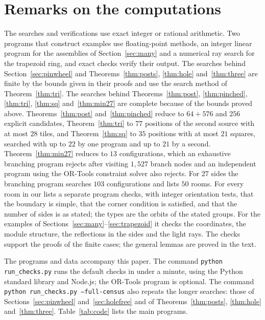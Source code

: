 \documentclass[11pt,a4paper]{article}
\theoremstyle{plain}
\theoremstyle{definition}
\theoremstyle{remark}
\numberwithin{equation}{section}
\begin{document}
\section{Remarks on the computations}\label{sec:computations}

The searches and verifications use exact integer or rational arithmetic. Two programs that construct examples use floating-point methods, an integer linear program for the assemblies of Section~\ref{sec:many} and a numerical ray search for the trapezoid ring, and exact checks verify their output. The searches behind Section~\ref{sec:pinwheel} and Theorems~\ref{thm:posts}, \ref{thm:hole} and~\ref{thm:three} are finite by the bounds given in their proofs and use the search method of Theorem~\ref{thm:tri}. The searches behind Theorems~\ref{thm:post}, \ref{thm:pinched}, \ref{thm:tri}, \ref{thm:sq} and~\ref{thm:min27} are complete because of the bounds proved above. Theorems~\ref{thm:post} and~\ref{thm:pinched} reduce to $64+576$ and $256$ explicit candidates, Theorem~\ref{thm:tri} to $77$ positions of the second source with at most $28$ tiles, and Theorem~\ref{thm:sq} to $35$ positions with at most $21$ squares, searched with up to $22$ by one program and up to $21$ by a second. Theorem~\ref{thm:min27} reduces to $13$ configurations, which an exhaustive branching program rejects after visiting $1{,}527$ branch nodes and an independent program using the OR-Tools constraint solver also rejects. For $27$ sides the branching program searches $103$ configurations and lists $50$ rooms. For every room in our lists a separate program checks, with integer orientation tests, that the boundary is simple, that the corner condition is satisfied, and that the number of sides is as stated; the types are the orbits of the stated groups. For the examples of Sections~\ref{sec:many}--\ref{sec:trapezoid} it checks the coordinates, the module structure, the reflections in the sides and the light rays. The checks support the proofs of the finite cases; the general lemmas are proved in the text.

The programs and data accompany this paper. The command \texttt{python run\_checks.py} runs the default checks in under a minute, using the Python standard library and Node.js; the OR-Tools program is optional. The command \texttt{python run\_checks.py --full-census} also repeats the longer searches: those of Sections~\ref{sec:pinwheel} and~\ref{sec:holefree} and of Theorems~\ref{thm:posts}, \ref{thm:hole} and~\ref{thm:three}. Table~\ref{tab:code} lists the main programs.
\end{document}
